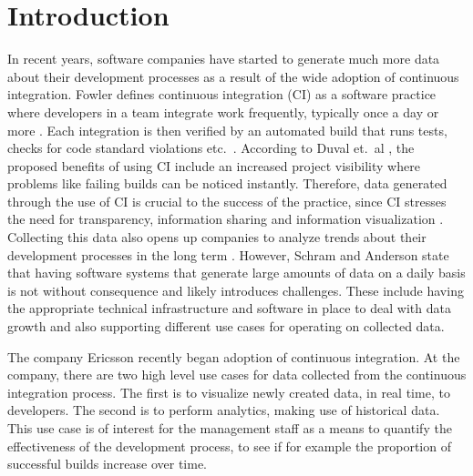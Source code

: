 \chapter{Introduction}
\label{chap:Introduction}

In recent years, software companies have started to generate much more data about their development processes as a result of the wide adoption of continuous integration. Fowler \cite{FowlerCI} defines continuous integration (CI) as a software practice where developers in a team integrate work frequently, typically once a day or more \cite{FowlerCI}. Each integration is then verified by an automated build that runs tests, checks for code standard violations etc.\ \cite{FowlerCI}. According to Duval et.\ al \cite{CIbook}, the proposed benefits of using CI include an increased project visibility where problems like failing builds can be noticed instantly. Therefore, data generated through the use of CI is crucial to the success of the practice, since CI stresses the need for transparency, information sharing and information visualization \cite{FowlerCI, CIbook}. Collecting this data also opens up companies to analyze trends about their development processes in the long term \cite{CIbook, bigDataMane}. However, Schram and Anderson \cite{MySQLToNoSQL} state that having software systems that generate large amounts of data on a daily basis is not without consequence and likely introduces challenges. These include having the appropriate technical infrastructure and software in place to deal with data growth and also supporting different use cases for operating on collected data.

The company Ericsson recently began adoption of continuous integration. At the company, there are two high level use cases for data collected from the continuous integration process. The first is to visualize newly created data, in real time, to developers. The second is to perform analytics, making use of historical data. This use case is of interest for the management staff as a means to quantify the effectiveness of the development process, to see if for example the proportion of successful builds increase over time.



